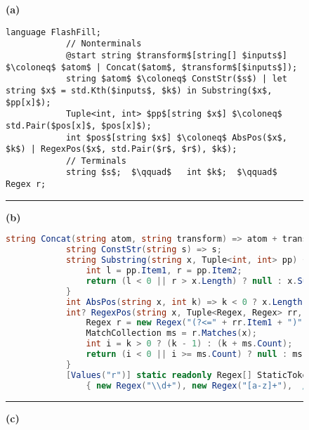 \begin{figure}[p!]
    \begin{fullpage}
        \centering
        \lstset{basicstyle = \footnotesize\ttfamily}
        \def\baselinestretch{1.05}
        \hfill\textbf{(a)}
        \vspace{-0.8\baselineskip}
        \begin{lstlisting}[language=dsl,gobble=12,morekeywords={Regex}]
            language FlashFill;
            // Nonterminals
            @start string $transform$[string[] $inputs$] $\coloneq$ $atom$ | Concat($atom$, $transform$[$inputs$]);
            string $atom$ $\coloneq$ ConstStr($s$) | let string $x$ = std.Kth($inputs$, $k$) in Substring($x$, $pp[x]$);
            Tuple<int, int> $pp$[string $x$] $\coloneq$ std.Pair($pos[x]$, $pos[x]$);
            int $pos$[string $x$] $\coloneq$ AbsPos($x$, $k$) | RegexPos($x$, std.Pair($r$, $r$), $k$);
            // Terminals
            string $s$;  $\qquad$   int $k$;  $\qquad$  Regex r;
        \end{lstlisting}
        \hrule
        \vspace{5pt}
        \hfill\textbf{(b)}
        \vspace{-0.9\baselineskip}
        \begin{lstlisting}[language=csharp,gobble=12,breaklines=false,morekeywords={Tuple}]
            string Concat(string atom, string transform) => atom + transform;
            string ConstStr(string s) => s;
            string Substring(string x, Tuple<int, int> pp) {
                int l = pp.Item1, r = pp.Item2;
                return (l < 0 || r > x.Length) ? null : x.Substring(l, r - l);
            }
            int AbsPos(string x, int k) => k < 0 ? x.Length + k + 1 : k;
            int? RegexPos(string x, Tuple<Regex, Regex> rr, int k) {
                Regex r = new Regex("(?<=" + rr.Item1 + ")" + rr.Item2);
                MatchCollection ms = r.Matches(x);
                int i = k > 0 ? (k - 1) : (k + ms.Count);
                return (i < 0 || i >= ms.Count) ? null : ms[i].Index;
            }
            [Values("r")] static readonly Regex[] StaticTokens =
                { new Regex("\\d+"), new Regex("[a-z]+"),  /* more tokens... */ }
        \end{lstlisting}
        \hrule
        \vspace{5pt}
        \hfill\textbf{(c)}
        \vspace{-0.9\baselineskip}

\end{fullpage}
\end{figure}
